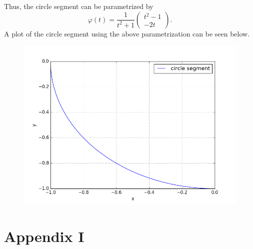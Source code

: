 \documentclass[]{article}
\begin{document}
Thus, the circle segment can be parametrized by \begin{equation*}
\varphi(t)=\frac{1}{t^2 + 1}\left(\begin{array}{c}
t^2 - 1\\
-2t
\end{array}\right).
\end{equation*}
A plot of the circle segment using the above parametrization can be seen below.
\begin{figure}[h!]
	\includegraphics[scale=0.6]{circlesegment}
\end{figure}

\newpage
\section*{Appendix I}

\end{document}
